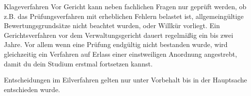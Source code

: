 \begin{artikel}{Klageverfahren}
Vor Gericht kann neben fachlichen Fragen nur geprüft werden, ob z.B. das Prüfungsverfahren mit erheblichen Fehlern belastet ist, allgemeingültige Bewertungsgrundsätze nicht beachtet wurden, oder Willkür vorliegt. Ein Gerichtsverfahren vor dem Verwaltungsgericht dauert regelmäßig ein bis zwei Jahre. Vor allem wenn eine Prüfung endgültig nicht bestanden wurde, wird gleichzeitig ein Verfahren auf Erlass einer einstweiligen Anordnung angestrebt, damit du dein Studium erstmal fortsetzen kannst.

Entscheidungen im Eilverfahren gelten nur unter Vorbehalt bis in der Hauptsache entschieden wurde.
\end{artikel}
